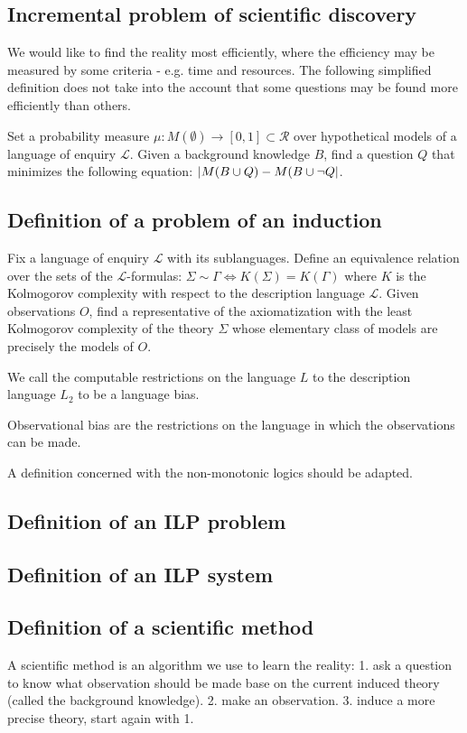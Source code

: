 \subsection{Incremental problem of scientific discovery}
We would like to find the reality most efficiently, where the efficiency may be measured by some criteria - e.g. time and resources. The following simplified definition does not take into the account that some questions may be found more efficiently than others.

Set a probability measure $\mu:M(\emptyset) \to [0,1] \subset \mathcal{R}$ over hypothetical models of a language of enquiry $\mathcal{L}$. Given a background knowledge $B$, find a question $Q$ that minimizes the following equation: $|M(B \cup {Q})-M(B \cup {\neg Q}|$.

\subsection{Definition of a problem of an induction}
Fix a language of enquiry $\mathcal{L}$ with its sublanguages. Define an equivalence relation over the sets of the
 $\mathcal{L}$-formulas: $\Sigma \sim \Gamma \iff K(\Sigma)=K(\Gamma)$
where $K$ is the Kolmogorov complexity with respect to the description language $\mathcal{L}$. Given observations $O$, find a representative of the axiomatization with the least Kolmogorov complexity of the theory $\Sigma$ whose elementary class of models are precisely the models of $O$.

We call the computable restrictions on the language $L$ to the description language $L_2$ to be a language bias.

Observational bias are the restrictions on the language in which the observations can be made.

A definition concerned with the non-monotonic logics should be adapted.

\subsection{Definition of an ILP problem}

\subsection{Definition of an ILP system}

\subsection{Definition of a scientific method}
A scientific method is an algorithm we use to learn the reality:
1. ask a question to know what observation should be made base on the current induced theory (called the background knowledge).
2. make an observation.
3. induce a more precise theory, start again with 1.